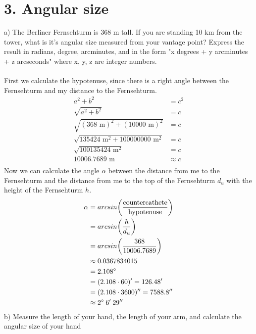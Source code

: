 \section*{3. Angular size}

a) The Berliner Fernsehturm is 368 m tall. If you are standing 10 km from the tower, what is it's angular
size measured from your vantage point? Express the result in radians, degree, arcminutes, and in the form
"x degrees + y arcminutes + z arcseconds" where x, y, z are integer numbers.\\
\\
First we calculate the hypotenuse, since there is a right angle between the Fernsehturm and my distance
to the Fernsehturm.
\begin{equation*}
    \begin{split}
        a^2 + b^2 &= c^2\\
        \sqrt{a^2 + b^2} &= c\\
        \sqrt{(368 \text{ m})^2 + (10000 \text{ m})^2} &= c\\
        \sqrt{135424 \text{ m}^2 + 100000000 \text{ m}^2} &= c\\
        \sqrt{100135424 \text{ m}^2} &= c\\
        10006.7689 \text{ m} &\approx c\\
    \end{split}
\end{equation*}
Now we can calculate the angle $\alpha$ between the distance from me to the Fernsehturm and the distance 
from me to the top of the Fernsehturm $d_u$ with the height of the Fernsehturm $h$.
\begin{equation*}
    \begin{split}
        \alpha &= arcsin \biggl(\frac{\text{countercathete}}{\text{hypotenuse}}\biggr)\\
        &= arcsin \biggl(\frac{h}{d_u}\biggr)\\
        &= arcsin \biggl(\frac{368}{10006.7689}\biggr)\\
        &\approx 0.0367834015\\
        &= 2.108 \degree\\
        &= (2.108 \cdot 60)' = 126.48'\\
        &= (2.108 \cdot 3600)'' = 7588.8''\\
        &\approx 2 \degree \: 6' \: 29''\\
    \end{split}
\end{equation*}
b) Measure the length of your hand, the length of your arm, and calculate the angular size of your hand
